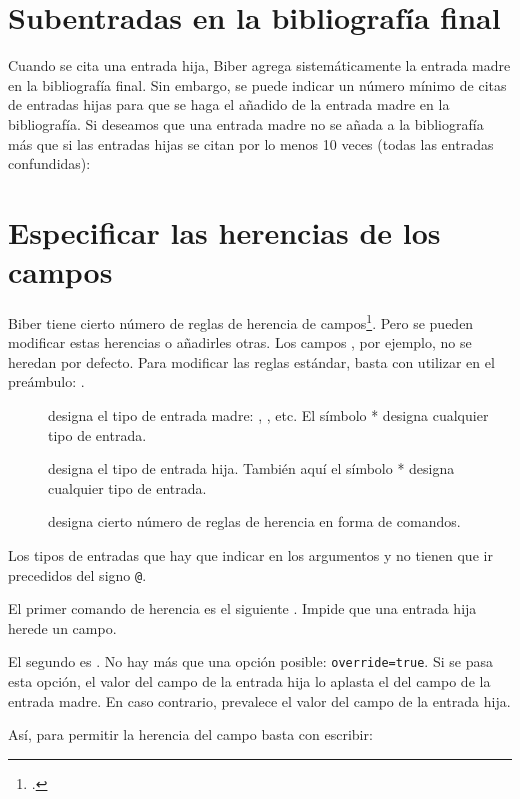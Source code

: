 \section{Subentradas en la bibliografía final}

Cuando se cita una entrada hija, Biber agrega sistemáticamente la entrada madre en la bibliografía final. Sin embargo, se puede indicar un número mínimo de citas de entradas hijas para que se haga el añadido de la entrada madre en la bibliografía. Si deseamos que una entrada madre  no se añada a la bibliografía más que si las entradas hijas se citan por lo menos 10 veces (todas las entradas confundidas):


\begin{latexcode}
\usepackage[mincrossrefs=10,…]{biblatex}
\end{latexcode}





\section{Especificar las herencias de los campos}

Biber tiene cierto número de reglas de herencia de campos\footcite{biblatex_crossrefsetup}. Pero se pueden modificar estas herencias o añadirles otras. Los campos , por ejemplo, no se heredan por defecto. 
Para modificar las reglas estándar, basta con utilizar en el preámbulo:
.

\begin{description}
\item[] designa el tipo de entrada madre: , , etc. El símbolo * designa cualquier tipo de entrada.
\item[] designa el tipo de entrada hija. También aquí el símbolo * designa cualquier tipo de entrada.
\item[] designa cierto número de reglas de herencia en forma de comandos.
\end{description}

Los tipos de entradas que hay que indicar en los argumentos  y  no tienen que ir precedidos del signo \verb|@|.

El primer comando de herencia es el siguiente .
Impide que una entrada hija herede un campo.

El segundo es
.
No hay más que una opción posible: \verb|override=true|. Si se pasa esta opción, el valor del campo de la entrada hija lo aplasta el del campo de la entrada madre. En caso contrario, prevalece el valor del campo de la entrada hija.

Así, para permitir la herencia del campo  basta con escribir:

\begin{latexcode}
\end{latexcode}

